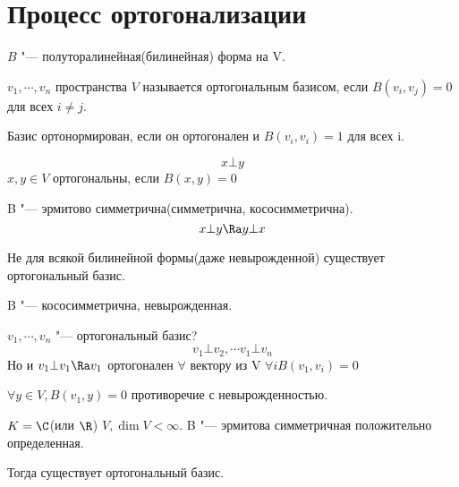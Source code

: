 ﻿\section{Процесс ортогонализации}
\begin{Def}
$B$ "--- полуторалинейная(билинейная) форма на V.

$v_1, \cdots, v_n$ пространства $V$ называется ортогональным базисом, если 
$B(v_i, v_j) = 0$ для всех $i \ne j$.

Базис ортонормирован, если он ортогонален и $B(v_i, v_i) = 1$ для всех i.
\end{Def}
\begin{Def}
 $$x \bot y $$
 $x, y \in V$ ортогональны, если $B(x, y) = 0$ 
 
\end{Def}
\begin{Rem}
 B "--- эрмитово симметрична(симметрична, кососимметрична).
 $$x \bot y \Ra y \bot x$$
\end{Rem}
\begin{Rem}
 Не для всякой билинейной формы(даже невырожденной) существует 
 ортогональный базис.
\end{Rem}
\begin{exmp}
B "--- кососимметрична, невырожденная. 

$v_1, \cdots, v_n$ "--- ортогональный базис?
$$v_1 \bot v_2, \cdots v_1 \bot v_n$$
Но и $v_1 \bot v_1 \Ra v_1$ ортогонален $\forall$ вектору
из V $\forall i B(v_1, v_i) = 0$

$\forall y \in V, B(v_1, y) = 0$ противоречие с невырожденностью.
\end{exmp}
\begin{theorem}{}
$K = \C$(или $\R$) $V, \dim V < \infty$.
B "--- эрмитова симметричная положительно определенная.

Тогда существует ортогональный базис.
\end{theorem}
